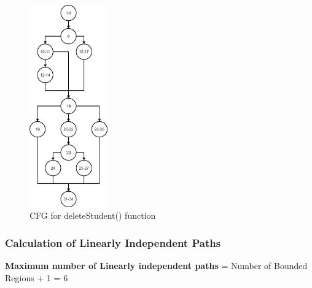 \documentclass{scrreprt}
\begin{document}
\begin{figure}[H]
\centering
\includegraphics[width=0.3\textwidth, keepaspectratio]{deleteStudent.png}
\caption{CFG for deleteStudent() function}
\end{figure}



\subsubsection{Calculation of Linearly Independent Paths}
\textbf{Maximum number of Linearly independent paths} = Number of Bounded Regions + 1 = 6
\end{document}
